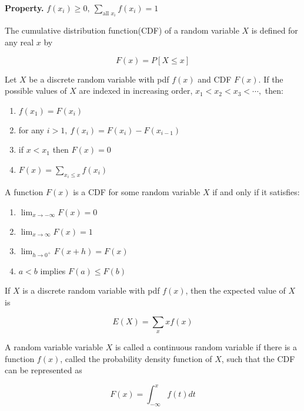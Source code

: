\textbf{Property.} $f(x_i) \geq 0,~\sum_{\text{all }x_i}f(x_i) = 1$
\begin{defn}
	The cumulative distribution function(CDF) of a random variable $X$ is defined for any real $x$ by
	
	$$F(x) = P[X \leq x]$$
\end{defn}


\begin{thm*}
	Let $X$ be a discrete random variable with pdf $f(x)$ and CDF $F(x)$. If the possible values of $X$ are indexed in increasing order, $x_1 < x_2 < x_3 < \cdots ,$ then:
	
	\begin{enumerate}[wide,label = ($\roman*$)]
		\item $f(x_1) = F(x_i)$
		\item for any $i>1,~f(x_i) = F(x_i) - F(x_{i-1})$
		\item if $x < x_1$ then $F(x) = 0$
		\item $F(x) = \sum_{x_i \leq x}f(x_i)$
	\end{enumerate}
\end{thm*}

\begin{thm*}
	A function $F(x)$ is a CDF for some random variable $X$ if and only if it satisfies: 
	
	\begin{enumerate}[wide, label = ($\roman*$)]
		\item $\lim_{x \rightarrow -\infty}F(x) = 0$
		\item $\lim_{x \rightarrow \infty}F(x) = 1$
		\item $\lim_{h \rightarrow 0^+} F(x+h) = F(x)$
		\item $a < b$ implies $F(a) \leq F(b)$
	\end{enumerate}
\end{thm*}

\begin{defn}
	If $X$ is a discrete random variable with pdf $f(x)$, then the expected value of $X$ is 
	
	$$E(X) = \sum_{x}xf(x)$$
\end{defn}

\begin{defn}
	A random variable variable $X$ is called a continuous random variable if there is a function $f(x)$, called the probability density function of $X$, such that the CDF can be represented as
	
	$$F(x) = \int^{x}_{-\infty}f(t)dt$$
\end{defn}


